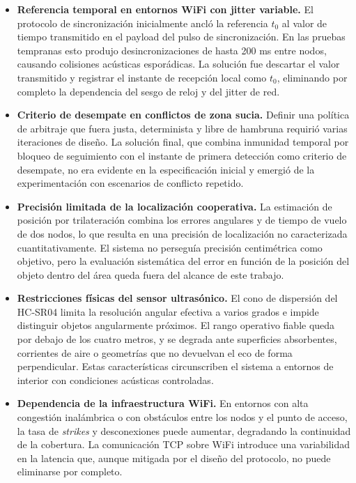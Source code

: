 \begin{itemize}
    \item \textbf{Referencia temporal en entornos WiFi con jitter variable.} El protocolo de sincronización inicialmente ancló la referencia $t_0$ al valor de tiempo transmitido en el payload del pulso de sincronización. En las pruebas tempranas esto produjo desincronizaciones de hasta 200 ms entre nodos, causando colisiones acústicas esporádicas. La solución fue descartar el valor transmitido y registrar el instante de recepción local como $t_0$, eliminando por completo la dependencia del sesgo de reloj y del jitter de red.

    \item \textbf{Criterio de desempate en conflictos de zona sucia.} Definir una política de arbitraje que fuera justa, determinista y libre de hambruna requirió varias iteraciones de diseño. La solución final, que combina inmunidad temporal por bloqueo de seguimiento con el instante de primera detección como criterio de desempate, no era evidente en la especificación inicial y emergió de la experimentación con escenarios de conflicto repetido.

    \item \textbf{Precisión limitada de la localización cooperativa.} La estimación de posición por trilateración combina los errores angulares y de tiempo de vuelo de dos nodos, lo que resulta en una precisión de localización no caracterizada cuantitativamente. El sistema no perseguía precisión centimétrica como objetivo, pero la evaluación sistemática del error en función de la posición del objeto dentro del área queda fuera del alcance de este trabajo.

    \item \textbf{Restricciones físicas del sensor ultrasónico.} El cono de dispersión del HC-SR04 limita la resolución angular efectiva a varios grados e impide distinguir objetos angularmente próximos. El rango operativo fiable queda por debajo de los cuatro metros, y se degrada ante superficies absorbentes, corrientes de aire o geometrías que no devuelvan el eco de forma perpendicular. Estas características circunscriben el sistema a entornos de interior con condiciones acústicas controladas.

    \item \textbf{Dependencia de la infraestructura WiFi.} En entornos con alta congestión inalámbrica o con obstáculos entre los nodos y el punto de acceso, la tasa de \textit{strikes} y desconexiones puede aumentar, degradando la continuidad de la cobertura. La comunicación TCP sobre WiFi introduce una variabilidad en la latencia que, aunque mitigada por el diseño del protocolo, no puede eliminarse por completo.
\end{itemize}

